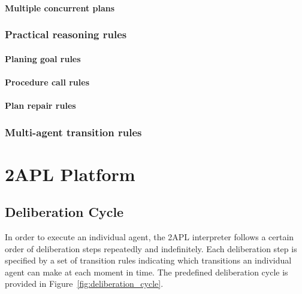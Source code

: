 \documentclass[a4paper]{article}
\begin{document}
\paragraph{Multiple concurrent plans}

\subsubsection{Practical reasoning rules}

\paragraph{Planing goal rules}

\paragraph{Procedure call rules}

\paragraph{Plan repair rules}

\subsubsection{Multi-agent transition rules}


\section{2APL Platform}\label{sec:platform} %

\subsection{Deliberation Cycle} %

In order to execute an individual agent, the 2APL interpreter follows a certain order of deliberation steps repeatedly and indefinitely. Each deliberation step is specified by a set of transition rules indicating which transitions an individual agent can make at each moment in time. The predefined deliberation cycle is provided in Figure~\ref{fig:deliberation_cycle}.
\end{document}
